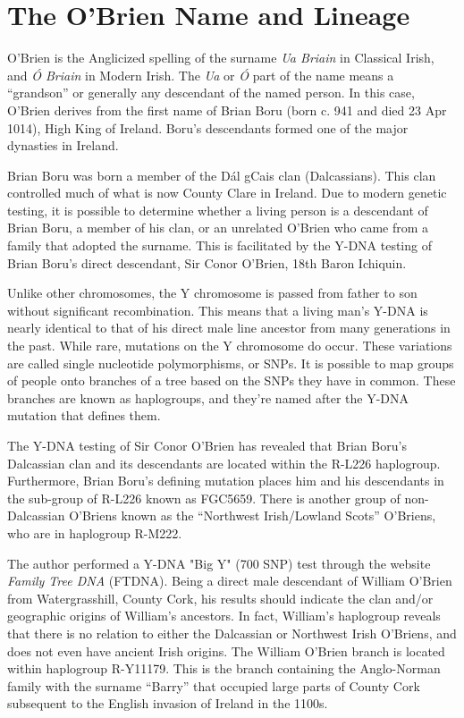 \chapter{The O'Brien Name and Lineage}

O'Brien is the Anglicized spelling of the surname \textit{Ua Briain} in Classical Irish, and \textit{\'{O} Briain} in Modern Irish. The \textit{Ua} or \textit{\'{O}} part of the name means a ``grandson'' or generally any descendant of the named person. In this case, O'Brien derives from the first name of Brian Boru (born c. 941 and died 23 Apr 1014), High King of Ireland. Boru's descendants formed one of the major dynasties in Ireland.\cite{BoruHistorical}

Brian Boru was born a member of the D\'{a}l gCais clan (Dalcassians). This clan controlled much of what is now County Clare in Ireland.\cite{BoruEarlyHistory} Due to modern genetic testing, it is possible to determine whether a living person is a descendant of Brian Boru, a member of his clan, or an unrelated O'Brien who came from a family that adopted the surname. This is facilitated by the Y-DNA testing of Brian Boru's direct descendant, Sir Conor O'Brien, 18th Baron Ichiquin.\cite{GGI}

Unlike other chromosomes, the Y chromosome is passed from father to son without significant recombination. This means that a living man's Y-DNA is nearly identical to that of his direct male line ancestor from many generations in the past. While rare, mutations on the Y chromosome do occur. These variations are called single nucleotide polymorphisms, or SNPs. It is possible to map groups of people onto branches of a tree based on the SNPs they have in common. These branches are known as haplogroups, and they're named after the Y-DNA mutation that defines them.\cite{Bettinger}

The Y-DNA testing of Sir Conor O'Brien has revealed that Brian Boru's Dalcassian clan and its descendants are located within the R-L226 haplogroup. Furthermore, Brian Boru's defining mutation places him and his descendants in the sub-group of R-L226 known as FGC5659. There is another group of non-Dalcassian O'Briens known as the ``Northwest Irish/Lowland Scots'' O'Briens, who are in haplogroup R-M222.\cite{GGI}

The author performed a Y-DNA "Big Y" (700 SNP) test through the website \textit{Family Tree DNA} (FTDNA). Being a direct male descendant of William O'Brien from Watergrasshill, County Cork, his results should indicate the clan and/or geographic origins of William's ancestors. In fact, William's haplogroup reveals that there is no relation to either the Dalcassian or Northwest Irish O'Briens, and does not even have ancient Irish origins. The William O'Brien branch is located within haplogroup R-Y11179. This is the branch containing the Anglo-Norman family with the surname ``Barry'' that occupied large parts of County Cork subsequent to the English invasion of Ireland in the 1100s.\cite{JamesBarry1,BigY}

